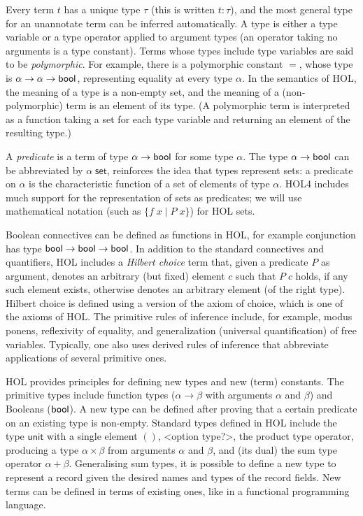 \documentclass[twoside,titlepage,11pt]{article}
\begin{document}
Every term $t$ has a unique type $\tau$ (this is written $t:\tau$), and the most general type for an unannotate term can be inferred automatically.
A type is either a type variable or a type operator applied to argument types (an operator taking no arguments is a type constant).
Terms whose types include type variables are said to be \emph{polymorphic}.
For example, there is a polymorphic constant $=$, whose type is $\alpha\to\alpha\to\mathsf{bool}$, representing equality at every type $\alpha$.
In the semantics of HOL, the meaning of a type is a non-empty set, and the meaning of a (non-polymorphic) term is an element of its type.
(A polymorphic term is interpreted as a function taking a set for each type variable and returning an element of the resulting type.)

A \emph{predicate} is a term of type $\alpha\to\mathsf{bool}$ for some type $\alpha$.
The type $\alpha\to\mathsf{bool}$ can be abbreviated by $\alpha\;\mathsf{set}$, reinforces the idea that types represent sets: a predicate on $\alpha$ is the characteristic function of a set of elements of type $\alpha$.
HOL4 includes much support for the representation of sets as predicates; we will use mathematical notation (such as $\{f\;x\mid P\;x\}$) for HOL sets.

Boolean connectives can be defined as functions in HOL, for example conjunction has type $\mathsf{bool}\to\mathsf{bool}\to\mathsf{bool}$.
In addition to the standard connectives and quantifiers, HOL includes a \emph{Hilbert choice} term that, given a predicate $P$ as argument, denotes an arbitrary (but fixed) element $c$ such that $P\; c$ holds, if any such element exists, otherwise denotes an arbitrary element (of the right type).
Hilbert choice is defined using a version of the axiom of choice, which is one of the axioms of HOL.
The primitive rules of inference include, for example, modus ponens, reflexivity of equality, and generalization (universal quantification) of free variables.
Typically, one also uses derived rules of inference that abbreviate applications of several primitive ones.

HOL provides principles for defining new types and new (term) constants.
The primitive types include function types ($\alpha\to\beta$ with arguments $\alpha$ and $\beta$) and Booleans ($\mathsf{bool}$).
A new type can be defined after proving that a certain predicate on an existing type is non-empty.
Standard types defined in HOL include the type $\mathsf{unit}$ with a single element $()$, <option type?>, the product type operator, producing a type $\alpha\times\beta$ from arguments $\alpha$ and $\beta$, and (its dual) the sum type operator $\alpha+\beta$.
Generalising sum types, it is possible to define a new type to represent a record given the desired names and types of the record fields.
New terms can be defined in terms of existing ones, like in a functional programming language.
\end{document}

